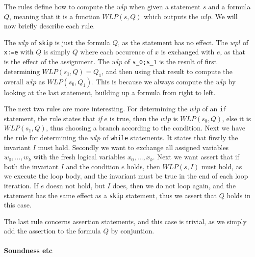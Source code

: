 The rules define how to compute the $wlp$ when given a statement $s$ and a formula $Q$, meaning that it is a function $WLP(s,Q)$ which outputs the $wlp$.
We will now briefly describe each rule.

The $wlp$ of \texttt{skip} is just the formula $Q$, as the statement has no effect.
The $wpl$ of \texttt{x:=e} with $Q$ is simply $Q$ where each occurence of $x$ is exchanged with $e$, as that is the effect of the assignment.
The $wlp$ of \texttt{s_0;s_1} is the result of first determining $WLP(s_{1},Q) = Q_{1}$, and then using that result to compute the overall $wlp$ as $WLP(s_{0}, Q_{1})$. This is because we always compute the $wlp$ by looking at the last statement, building up a formula from right to left.

The next two rules are more interesting.
For determining the $wlp$ of an \texttt{if} statement, the rule states that \textit{if} $e$ is true, then the $wlp$ is $WLP(s_{0}, Q)$, else it is $WLP(s_{1},Q)$, thus choosing a branch according to the condition.
Next we have the rule for determining the $wlp$ of \texttt{while} statements.
It states that firstly the invariant $I$ must hold. Secondly we want to exchange all assigned variables $w_{0},...,w_{k}$ with the fresh logical variables $x_{0},...,x_{k}$. Next we want assert that if both the invariant $I$ and the condition $e$ holds, then $WLP(s, I)$ must hold, as we execute the loop body, and the invariant must be true in the end of each loop iteration. If $e$ doesn not hold, but $I$ does, then we do not loop again, and the statement has the same effect as a \texttt{skip} statement, thus we assert that $Q$ holds in this case.

The last rule concerns assertion statements, and this case is trivial, as we simply add the assertion to the formula $Q$ by conjuntion.

\paragraph{Soundness etc}

